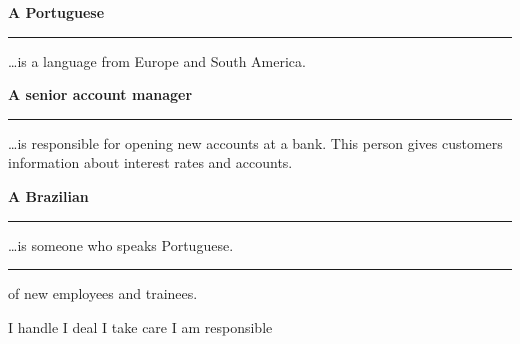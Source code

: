 \documentclass[1pt]{exam}
\newcommand*\Matching[1]{
\ifprintanswers
    \textbf{#1}
\else
    \rule{2.1in}{0.5pt}
\fi
}
\newlength\matchlena
\newlength\matchlenb
\newcommand\MatchQuestion[2]{%
    \setlength\matchlenb{\linewidth}
    \addtolength\matchlenb{-\matchlena}
    \parbox[t]{\matchlena}{\Matching{#1}}\enspace\parbox[t]{\matchlenb}{#2}}
\newcommand{\midmatch}{\hspace{0.75in}\underline{\hspace{0.5in}     }}
\begin{document}
\begin{questions}
\question\MatchQuestion{A Portuguese}{\dots is a language from Europe and South America. }
\vspace{0.7\baselineskip}

\question\MatchQuestion{A senior account manager}{\dots is responsible for opening new accounts at a bank. This person gives customers information about interest rates and accounts.}
\vspace{0.7\baselineskip}

\question\MatchQuestion{A Brazilian }{\ldots is someone who speaks Portuguese.}
\vspace{0.7\baselineskip}




\question
   \rule{2cm}{.4pt} of new employees and trainees.\\
   \begin{oneparchoices}
    \choice I handle
    \choice I deal 
    \choice I take care
    \choice I am  responsible 
\end{oneparchoices}


\end{questions}
\end{document}
